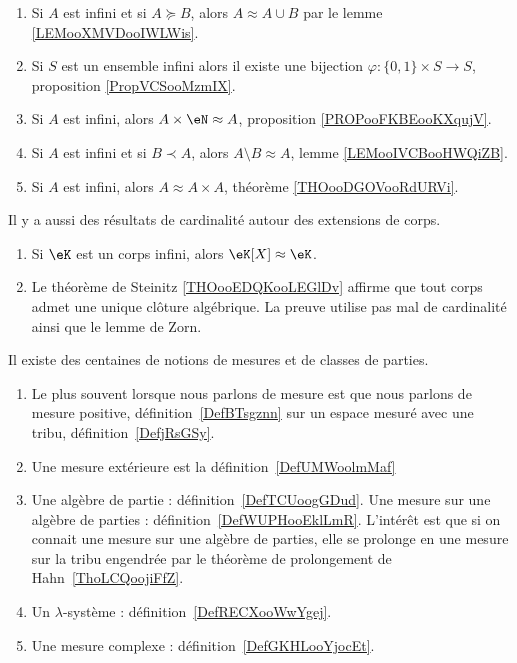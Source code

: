\begin{enumerate}
\item 
    Si \( A\) est infini et si \( A\succeq B\), alors \( A\approx A\cup B\) par le lemme \ref{LEMooXMVDooIWLWis}.
\item
    Si \( S\) est un ensemble infini alors il existe une bijection \( \varphi\colon \{ 0,1 \}\times S\to S\), proposition \ref{PropVCSooMzmIX}.
\item
    Si \( A\) est infini, alors \( A\times \eN\approx A\), proposition \ref{PROPooFKBEooKXqujV}.
\item 
    Si \( A\) est infini et si \( B\prec A\), alors \( A\setminus B\approx A\), lemme \ref{LEMooIVCBooHWQiZB}.
\item
    Si \( A\) est infini, alors \( A\approx A\times A\), théorème \ref{THOooDGOVooRdURVi}.
\end{enumerate}

Il y a aussi des résultats de cardinalité autour des extensions de corps.
\begin{enumerate}
    \item
        Si \( \eK\) est un corps infini, alors \( \eK[X]\approx \eK\).
    \item
        Le théorème de Steinitz \ref{THOooEDQKooLEGlDv} affirme que tout corps admet une unique clôture algébrique. La preuve utilise pas mal de cardinalité ainsi que le lemme de Zorn.
\end{enumerate}

  \label{INTooVDSCooHXLLKp}
    Il existe des centaines de notions de mesures et de classes de parties.
\begin{enumerate}
        \item
            Le plus souvent lorsque nous parlons de mesure est que nous parlons de mesure positive, définition~\ref{DefBTsgznn} sur un espace mesuré avec une tribu, définition~\ref{DefjRsGSy}.
        \item
            Une mesure extérieure est la définition~\ref{DefUMWoolmMaf}
        \item
            Une algèbre de partie : définition~\ref{DefTCUoogGDud}. Une mesure sur une algèbre de parties : définition~\ref{DefWUPHooEklLmR}. L'intérêt est que si on connait une mesure sur une algèbre de parties, elle se prolonge en une mesure sur la tribu engendrée par le théorème de prolongement de Hahn~\ref{ThoLCQoojiFfZ}.
        \item
            Un \( \lambda\)-système : définition~\ref{DefRECXooWwYgej}.
        \item
            Une mesure complexe : définition~\ref{DefGKHLooYjocEt}.
\end{enumerate}

